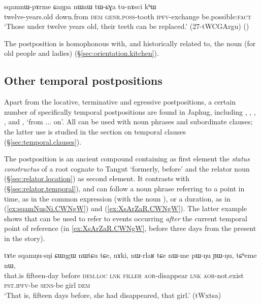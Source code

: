  \begin{exe}
\ex \label{ex:sqamnW.pArme.CaNpa}
 \gll sqamnɯ-pɤrme ɕaŋpa nɯnɯ tɯ-ɕɣa tu-nɤsci kʰɯ \\
 twelve-years.old down.from \textsc{dem} \textsc{genr}.\textsc{poss}-tooth \textsc{ipfv}-exchange be.possible:\textsc{fact} \\
 \glt `Those under twelve years old, their teeth can be replaced.' (27-tWCGArgu) ()
\end{exe}

The postposition  is homophonous with, and historically related to, the noun  (for old people and ladies) (§\ref{sec:orientation.kitchen}).

\subsection{Other temporal postpositions} \label{sec:temporal.postpositions}
Apart from the locative, terminative and egressive postpositions, a certain number of specifically temporal postpositions are found in Japhug, including ,  , , ,  and , `from ... on'. All can be used with noun phrases and subordinate clauses; the latter use is studied in the section on temporal clauses (§\ref{sec:temporal.clauses}).

The postposition   is an ancient compound containing as first element the \textit{status constructus} of a root cognate to Tangut  `formerly, before' and the relator noun  (§\ref{sec:relator.location}) as second element. It contrasts with   (§\ref{sec:relator.temporal}), and can follow a noun phrase referring to a point in time, as in the common expression  (with the noun  ), or a duration, as in (\ref{ex:sqamNusNi.CWNgW}) and (\ref{ex:XsArZaR.CWNgW}). The latter example shows that  can be used to refer to events occurring \textit{after} the current temporal point of reference (in \ref{ex:XsArZaR.CWNgW}, before three days from the present in the story).

\begin{exe}
\ex \label{ex:sqamNusNi.CWNgW}
 \gll tɤte sqamŋu-sŋi ɕɯŋgɯ nɯtɕu tɕe, nɤki, nɯ-rlaʁ tɕe nɯ-me pɯ-ŋu ɲɯ-ŋu, tɕʰeme nɯ, \\
 that.is fifteen-day before \textsc{dem}.\textsc{loc} \textsc{lnk} \textsc{filler} \textsc{aor}-disappear \textsc{lnk} \textsc{aor}-not.exist \textsc{pst}.\textsc{ipfv}-be \textsc{sens}-be girl \textsc{dem} \\
 \glt `That is, fifteen days before, she had disappeared, that girl.' (tWxtsa)
\end{exe}


